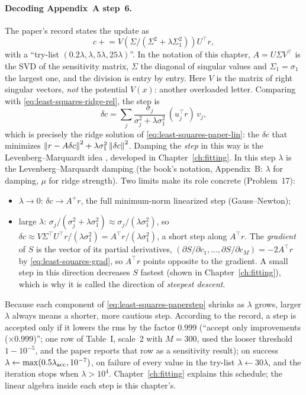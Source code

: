 \paragraph{Decoding Appendix~A step~6.} The paper's record states the update as
\[
c \mathrel{+}= V\!\left(\Sigma/(\Sigma^2+\lambda\Sigma_1^2)\right)U^\top r ,
\]
with a ``try-list $(0.2\lambda,\lambda,5\lambda,25\lambda)$''. In the notation of this chapter, $A = U\Sigma V^\top$ is the SVD of the sensitivity matrix, $\Sigma$ the diagonal of singular values and $\Sigma_1 = \sigma_1$ the largest one, and the division is entry by entry. Here $V$ is the matrix of right singular vectors, \emph{not} the potential $V(x)$: another overloaded letter. Comparing with \cref{eq:least-squares-ridge-rel}, the step is
\begin{equation}
\delta c = \sum_j\frac{\sigma_j}{\sigma_j^2+\lambda\sigma_1^2}\,(u_j^\top r)\,v_j ,
\label{eq:least-squares-paperstep}
\end{equation}
which is precisely the ridge solution of \cref{eq:least-squares-paper-lin}: the $\delta c$ that minimizes $\left\lVert r - A\delta c\right\rVert^2 + \lambda\sigma_1^2\left\lVert \delta c\right\rVert^2$. Damping the \emph{step} in this way is the Levenberg--Marquardt idea \cite{marquardt}, developed in Chapter~\ref{ch:fitting}. In this step $\lambda$ is the Levenberg--Marquardt damping (the book's notation, Appendix~B: $\lambda$ for damping, $\mu$ for ridge strength). Two limits make its role concrete (Problem~17):
\begin{itemize}
\item $\lambda\to0$: $\delta c\to A^+r$, the full minimum-norm linearized step (Gauss--Newton);
\item large $\lambda$: $\sigma_j/(\sigma_j^2+\lambda\sigma_1^2)\approx\sigma_j/(\lambda\sigma_1^2)$, so $\delta c\approx V\Sigma^\top U^\top r/(\lambda\sigma_1^2) = A^\top r/(\lambda\sigma_1^2)$, a short step along $A^\top r$. The \emph{gradient} of $S$ is the vector of its partial derivatives, $(\partial S/\partial c_1,\dots,\partial S/\partial c_M) = -2A^\top r$ by \cref{eq:least-squares-grad}, so $A^\top r$ points opposite to the gradient. A small step in this direction decreases $S$ fastest (shown in Chapter~\ref{ch:fitting}), which is why it is called the direction of \emph{steepest descent}.
\end{itemize}
Because each component of \cref{eq:least-squares-paperstep} shrinks as $\lambda$ grows, larger $\lambda$ always means a shorter, more cautious step. According to the record, a step is accepted only if it lowers the rms by the factor $0.999$ (``accept only improvements ($\times0.999$)''; one row of Table~I, scale~2 with $M=300$, used the looser threshold $1-10^{-5}$, and the paper reports that row as a sensitivity result); on success $\lambda\leftarrow\max(0.5\lambda_{\rm acc},10^{-7})$, on failure of every value in the try-list $\lambda\leftarrow30\lambda$, and the iteration stops when $\lambda>10^4$. Chapter~\ref{ch:fitting} explains this schedule; the linear algebra inside each step is this chapter's.


